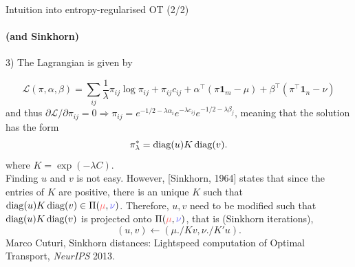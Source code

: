 \documentclass[pdf,aspectratio=169,10pt]{beamer}
\begin{document}
\begin{frame}{Intuition into entropy-regularised OT (2/2)}
\framesubtitle{(and Sinkhorn)}

3) The Lagrangian is given by 

$$\mathcal{L}(\pi,\alpha,\beta) = \sum_{ij} \frac{1}{\lambda}\pi_{ij} \log\pi_{ij} + \pi_{ij}c_{ij} + \alpha^\top(\pi\mathbf{1}_m - \mu) + \beta^\top(\pi^\top\mathbf{1}_n - \nu)$$
and thus $\partial \mathcal{L} / \partial \pi_{ij} = 0 \Rightarrow \pi_{ij} = e^{-1/2-\lambda\alpha_i}e^{-\lambda c_{ij}}e^{-1/2-\lambda\beta_j}$, meaning that the solution has the form
$$\pi_\lambda^* = \mathop{\rm diag}\nolimits(u) K \mathop{\rm diag}\nolimits(v).$$
where $K= \exp\left(-\lambda C \right) $. \\

Finding $u$ and $v$ is not easy. However, [Sinkhorn, 1964] states that since the entries of $K$ are positive, there is an unique $K$ such that $\diag(u) K \diag(v)\in\Pi(\er{\mu},\eb{\nu})$. Therefore, $u,v$ need to be modified such that $\mathop{\rm diag}\nolimits(u) K \mathop{\rm diag}\nolimits(v)$ is projected onto $\Pi(\er{\mu},\eb{\nu})$, that is (Sinkhorn iterations),
\begin{equation}
    (u,v) \leftarrow (\mu./Kv, \nu./K'u ).
\end{equation}
{\tiny
Marco Cuturi, Sinkhorn distances: Lightspeed computation of Optimal Transport, \emph{NeurIPS} 2013. 
}
\end{frame}
\end{document}
